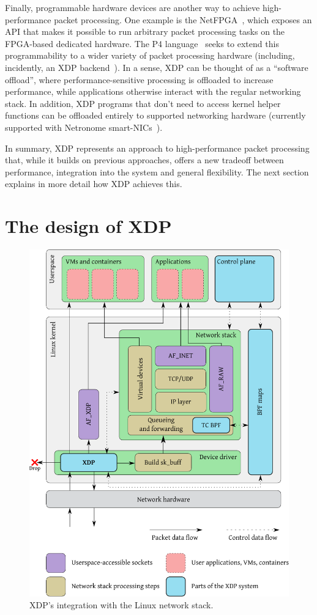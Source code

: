 \documentclass[sigconf]{acmart}
\begin{document}
Finally, programmable hardware devices are another way to achieve
high-performance packet processing. One example is the
NetFPGA~\cite{lockwood2007netfpga}, which exposes an API that makes it possible
to run arbitrary packet processing tasks on the FPGA-based dedicated hardware.
The P4 language~\cite{bosshart2014p4} seeks to extend this programmability to a
wider variety of packet processing hardware (including, incidently, an XDP
backend~\cite{p4xdp}). In a sense, XDP can be thought of as a ``software
offload'', where performance-sensitive processing is offloaded to increase
performance, while applications otherwise interact with the regular networking
stack. In addition, XDP programs that don't need to access kernel helper
functions can be offloaded entirely to supported networking hardware (currently
supported with Netronome smart-NICs~\cite{xdp-offload}).

In summary, XDP represents an approach to high-performance packet processing
that, while it builds on previous approaches, offers a new tradeoff between
performance, integration into the system and general flexibility. The next
section explains in more detail how XDP achieves this.

\section{The design of XDP}
\label{sec:design}

\begin{figure}[t]
\centering
\includegraphics[width=\linewidth]{figures/kernel-diagram.pdf}
\caption{\label{fig:xdp-kernel} XDP's integration with the Linux network stack.}
\end{figure}
\end{document}
